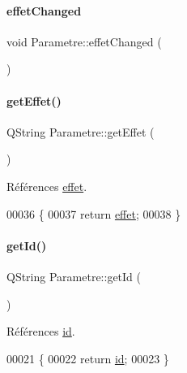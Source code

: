 \paragraph{\texorpdfstring{effet\+Changed}{effetChanged}}
{\footnotesize\ttfamily void Parametre\+::effet\+Changed (\begin{DoxyParamCaption}{ }\end{DoxyParamCaption})\hspace{0.3cm}{\ttfamily [signal]}}

\mbox{\label{class_parametre_aa256fc71d142a9a9cfeab2d2686f0d9d}} 
\paragraph{\texorpdfstring{get\+Effet()}{getEffet()}}
{\footnotesize\ttfamily Q\+String Parametre\+::get\+Effet (\begin{DoxyParamCaption}{ }\end{DoxyParamCaption})}



Références \hyperlink{class_parametre_a1ac07f14fbc50b243b57246f662fe67f}{effet}.


\begin{DoxyCode}
00036 \{
00037     \textcolor{keywordflow}{return} \hyperlink{class_parametre_a1ac07f14fbc50b243b57246f662fe67f}{effet};
00038 \}
\end{DoxyCode}
\mbox{\label{class_parametre_a5831b57e743a12d6d1a8af98e9abcccb}} 
\paragraph{\texorpdfstring{get\+Id()}{getId()}}
{\footnotesize\ttfamily Q\+String Parametre\+::get\+Id (\begin{DoxyParamCaption}{ }\end{DoxyParamCaption})}



Références \hyperlink{class_parametre_aa60cee81cf82cba4c7b216f15adf8a80}{id}.


\begin{DoxyCode}
00021 \{
00022     \textcolor{keywordflow}{return} \hyperlink{class_parametre_aa60cee81cf82cba4c7b216f15adf8a80}{id};
00023 \}
\end{DoxyCode}
\mbox{\label{class_parametre_a47d9b5efc103fa6a4a69754136ffa641}} 
